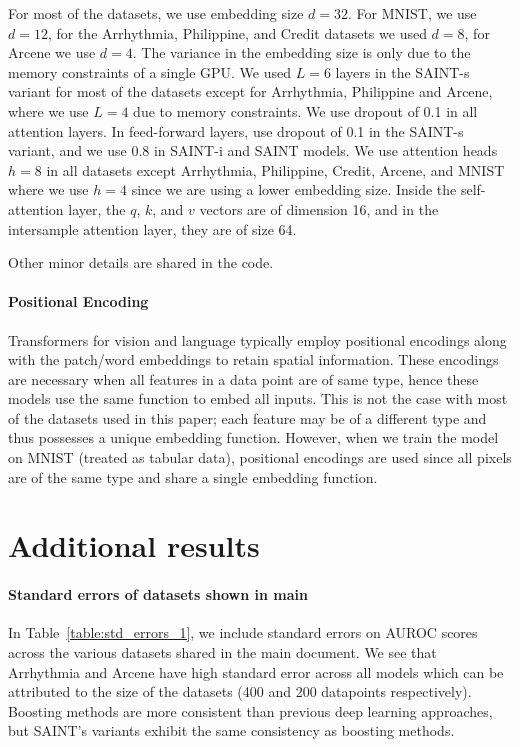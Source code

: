 For most of the datasets, we use embedding size $d=32$. For MNIST, we use $d=12$, for the Arrhythmia, Philippine, and Credit datasets we used $d=8$, for Arcene we use $d=4$. The variance in the embedding size is only due to the memory constraints of a single GPU. We used $L=6$ layers in the SAINT-s variant for most of the datasets except for Arrhythmia, Philippine and Arcene, where we use $L=4$ due to memory constraints. We use dropout of 0.1 in all attention layers. In feed-forward layers, use dropout of 0.1 in the SAINT-s variant, and we use 0.8 in SAINT-i and SAINT models. We use attention heads $h=8$ in all datasets except Arrhythmia, Philippine, Credit, Arcene, and MNIST where we use $h=4$ since we are using a lower embedding size. Inside the self-attention layer, the $q$, $k$, and $v$ vectors are of dimension 16, and in the intersample attention layer, they are of size 64.

Other minor details are shared in the code.



\paragraph{Positional Encoding} Transformers for vision and language typically employ positional encodings along with the patch/word embeddings to retain spatial information. These encodings are necessary when all features in a data point are of same type, hence these models use the same function to embed all inputs. This is not the case with most of the datasets used in this paper; each feature may be of a different type and thus possesses a unique embedding function. However, when we train the model on MNIST (treated as tabular data), positional encodings are used since all pixels are of the same type and share a single embedding function.



\section{Additional results}
\label{appendix_sec:exhaustive_results}
\paragraph{Standard errors of datasets shown in main}
In Table~\ref{table:std_errors_1}, we include standard errors on AUROC scores across the various datasets shared in the main document. We see that Arrhythmia and Arcene have high standard error across all models which can be attributed to the size of the datasets (400 and 200 datapoints respectively). Boosting methods are more consistent than previous deep learning approaches, but SAINT's variants exhibit the same consistency as boosting methods.


